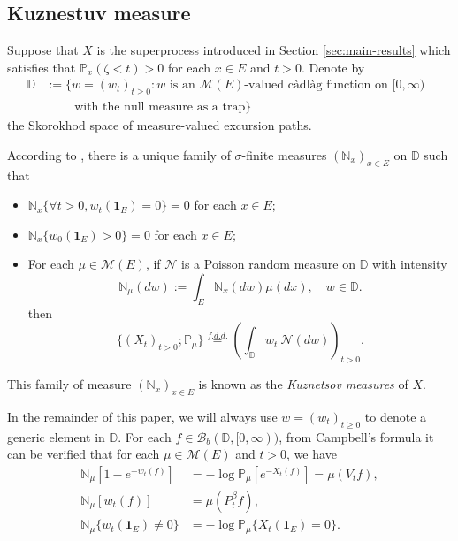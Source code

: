 \documentclass[12pt,a4paper]{amsart}
\numberwithin{equation}{section}
\theoremstyle{plain}
\theoremstyle{definition}
\begin{document}
\subsection{Kuznestuv measure}
Suppose that $X$ is the superprocess introduced in Section \ref{sec:main-results} which satisfies that $\mathbb P_{x}(\zeta < t)>0$ for each $x\in E$ and $t>0$. Denote by
\begin{align}
	\mathbb D &:=\{ w= (w_t)_{t\geq 0}: w \text{ is an $\mathcal M(E)$-valued c\`{a}dl\`{a}g function on $[0,\infty)$ }
	\\ &\qquad \text{ with the null measure as a trap} \}
\end{align}
the Skorokhod space of measure-valued excursion paths.

According to \cite[Section 8.4]{Li2011Measurevalued}, there is a unique family of $\sigma$-finite measures $(\mathbb N_x)_{x\in E}$ on $\mathbb D$ such that
\begin{itemize}
\item
  $\mathbb N_x \{\forall t > 0, w_t(\mathbf 1_E)=0\} =0$ for each $x\in E$;
\item
  $\mathbb N_x \{ w_0(\mathbf 1_E) > 0\} = 0$ for each $x\in E$;
\item
  For each $\mu \in \mathcal M(E)$, if $\mathcal N$ is a Poisson random measure on $\mathbb D$ with intensity
  \[
    \mathbb N_\mu(dw):= \int_E \mathbb N_x(dw)\mu(dx), \quad w\in \mathbb D.
  \]
	then
  \[
    \{(X_t)_{t> 0};\mathbb P_\mu\}
    \overset{f.d.d.}{=} \left(\int_{\mathbb D} w_t~\mathcal N(dw)\right)_{t> 0}.
  \]
\end{itemize}
This family of measure $(\mathbb N_x)_{x\in E}$ is known as the \emph{Kuznetsov measures} of $X$.


In the remainder of this paper, we will always use $w = (w_t)_{t\geq 0}$ to denote a generic element in $\mathbb D$.
For each $f\in \mathcal B_b(\mathbb D, [0,\infty))$, from Campbell's formula it can be verified that for each $\mu\in \mathcal M(E)$ and $t>0$, we have
\begin{align}\label{eq: kuznetsov Laplace}
 	\mathbb N_\mu[1-e^{-w_t(f) }]
 	&=-\log \mathbb P_\mu[e^{-X_t(f)}] 
    = \mu(V_t f),
 	\\ \mathbb N_\mu[w_t(f)]
 	&=\mu(P_t^{\beta}f),
 	\\\mathbb N_\mu\{w_t(\mathbf 1_E) \neq 0\}
 	&=-\log\mathbb P_\mu\{X_t(\mathbf 1_E) = 0\}.
\end{align}
\end{document}
